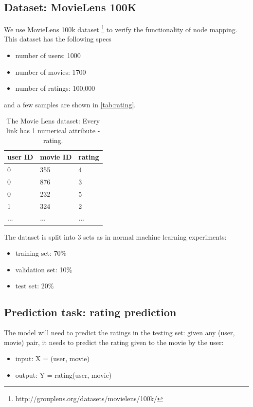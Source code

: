 \documentclass{article}
\begin{document}
\subsection{Dataset: MovieLens 100K}
We use MovieLens 100k dataset \cite{harper2015movielens} 
\footnote{http://grouplens.org/datasets/movielens/100k/} to verify the 
functionality of node mapping. This dataset has the following specs
\begin{itemize}
	\item number of users: 1000
	\item number of movies: 1700
	\item number of ratings: 100,000
\end{itemize}
and a few samples are shown in \autoref{tab:rating}.
\begin{table}[h]
	\centering
	\begin{tabularx}{0.5\textwidth}{|X|X|X| }  \hline
		user ID & movie ID & rating \\ \hline
		0 & 355 & 4 \\ \hline
		0 & 876 & 3 \\ \hline
		0 & 232 & 5 \\ \hline
		1 & 324 & 2 \\ \hline
		... & ... & ... \\ \hline
	\end{tabularx}
	\caption{The Movie Lens dataset: Every link has 1 numerical attribute - 
	rating.}
	\label{tab:rating}
\end{table}
The dataset is split into 3 sets as in normal machine learning experiments:
\begin{itemize}
	\item training set: 70\%
	\item validation set: 10\%
	\item test set: 20\%
\end{itemize}

\subsection{Prediction task: rating prediction}
The model will need to predict the ratings in the testing set: given any (user, 
movie) pair, it needs to predict the rating given to the movie by the user:
\begin{itemize}
	\item input: X = (user, movie)
	\item output: Y = rating(user, movie)
\end{itemize}
\end{document}
